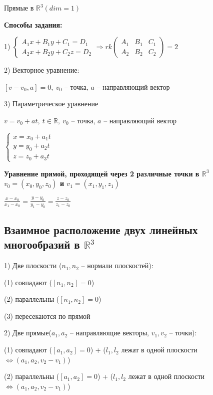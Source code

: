 \vspace{\baselineskip}
Прямые в $\mathbb{R}^3 (dim = 1)$

\textbf{Способы задания:}

1) $\begin{cases} A_1 x + B_1 y + C_1 = D_1 \\ A_2 x + B_2 y + C_2 z = D_2 \end{cases} \Rightarrow rk \begin{pmatrix} A_1 & B_1 & C_1 \\ A_2 & B_2 & C_2 \end{pmatrix} = 2$

2) Векторное уравнение:

$[v - v_0, a] = 0, \ v_0$ -- точка, $a$ -- направляющий вектор

3) Параметрическое уравнение

$v = v_0 + at, \ t \in \mathbb{R}, \ v_0$ -- точка, $a$ -- направляющий вектор

$\begin{cases} x = x_0 + a_1 t \\ y = y_0 + a_2 t \\ z = z_0 + a_3 t \end{cases}$

\vspace{\baselineskip}
\textbf{Уравнение прямой, проходящей через 2 различные точки в $\mathbb{R}^3$ $v_0 = (x_0, y_0, z_0)$ и $v_1 = (x_1, y_1, z_1)$}

$\frac{x - x_0}{x_1 - x_0} = \frac{y - y_0}{y_1 - y_0} = \frac{z - z_0}{z_1 - z_0}$

\subsection{Взаимное расположение двух линейных многообразий в $\mathbb{R}^3$}

1) Две плоскости ($n_1, n_2$ -- нормали плоскостей):

(1) совпадают ($[n_1, n_2] = 0$)

(2) параллельны ($[n_1, n_2] = 0$)

(3) пересекаются по прямой

\vspace{\baselineskip}
2) Две прямые($a_1, a_2$ -- направляющие векторы, $v_1, v_2$ -- точки):

(1) совпадают ($[a_1, a_2] = 0$) + ($l_1, l_2$ лежат в одной плоскости $\Leftrightarrow (a_1, a_2, v_2 - v_1)$)

(2) параллельны ($[a_1, a_2] = 0$) + ($l_1, l_2$ лежат в одной плоскости $\Leftrightarrow (a_1, a_2, v_2 - v_1)$)

